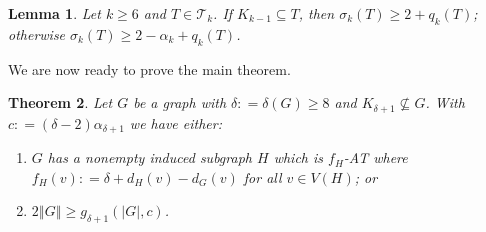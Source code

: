 \documentclass[12pt]{article}
\theoremstyle{plain}
\newtheorem{thm}{Theorem}[section]
\newtheorem{lem}[thm]{Lemma}
\theoremstyle{definition}
\theoremstyle{remark}
\newcommand{\fancy}[1]{\mathcal{#1}}
\newcommand{\T}{\fancy{T}}
\newcommand{\card}[1]{\left|#1\right|}
\newcommand{\size}[1]{\left\Vert#1\right\Vert}
\newcommand{\DefinedAs}{\mathrel{\mathop:}=}
\begin{document}
\begin{lem}\label{SigmaBoundEuler}
Let $k \geq 6$ and $T \in \T_k$. If $K_{k-1} \subseteq T$, then $\sigma_k(T) \geq 2 + q_k(T)$; otherwise $\sigma_k(T) \geq 2 - \alpha_k + q_k(T)$.
\end{lem}

\noindent We are now ready to prove the main theorem.

\begin{thm}\label{EdgeBoundEuler}
Let $G$ be a graph with $\delta \DefinedAs \delta(G) \geq 8$ and $K_{\delta + 1} \not \subseteq G$. With $c \DefinedAs (\delta-2)\alpha_{\delta + 1}$ we have either:
\begin{enumerate}
\item $G$ has a nonempty induced subgraph $H$ which is $f_H$-AT where $f_H(v) \DefinedAs \delta + d_H(v) - d_G(v)$ for all $v \in V(H)$; or
\item $2\size{G} \geq g_{\delta+1}(\card{G}, c)$.
\end{enumerate}
\end{thm}
\end{document}
